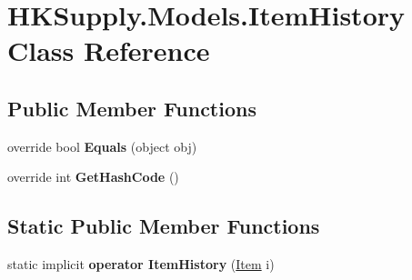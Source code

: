 \hypertarget{class_h_k_supply_1_1_models_1_1_item_history}{}\section{H\+K\+Supply.\+Models.\+Item\+History Class Reference}
\label{class_h_k_supply_1_1_models_1_1_item_history}
\subsection*{Public Member Functions}
\begin{DoxyCompactItemize}
\item 
\mbox{\label{class_h_k_supply_1_1_models_1_1_item_history_a4bd33e805f07701ea1bc1c70108e8af5}} 
override bool {\bfseries Equals} (object obj)
\item 
\mbox{\label{class_h_k_supply_1_1_models_1_1_item_history_a8b5ac98738d0ad86f3996052d600839c}} 
override int {\bfseries Get\+Hash\+Code} ()
\end{DoxyCompactItemize}
\subsection*{Static Public Member Functions}
\begin{DoxyCompactItemize}
\item 
\mbox{\label{class_h_k_supply_1_1_models_1_1_item_history_acfa7b8654eb6f839a690e97a77856784}} 
static implicit {\bfseries operator Item\+History} (\hyperlink{class_h_k_supply_1_1_models_1_1_item}{Item} i)
\end{DoxyCompactItemize}
